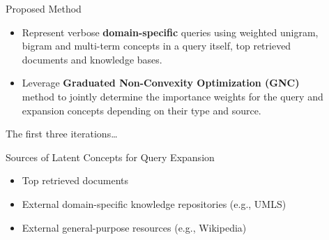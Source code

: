 \documentclass[final]{beamer}
\newlength{\sepwid}
\newlength{\onecolwid}
\newlength{\twocolwid}
\begin{document}
\begin{frame}[t]
\begin{columns}[t]
\begin{column}{\onecolwid}
\end{column} %

\begin{column}{\sepwid}\end{column} %

\begin{column}{\twocolwid} %


\begin{alertblock}{Proposed Method}
  \begin{itemize}
\item Represent verbose \textbf{domain-specific } queries using weighted unigram, bigram and multi-term concepts in a query itself, top retrieved documents and knowledge bases.
\item Leverage \textbf{Graduated Non-Convexity Optimization (GNC)} method to jointly determine the importance weights for the query and expansion concepts depending on their type and source.
\end{itemize}
\end{alertblock}


\begin{alertblock}{The first three iterations\ldots}
  \begin{figure}[!htb]
  \centering
  \end{figure}
\end{alertblock}

\begin{alertblock}{ Sources of Latent Concepts for Query Expansion}
\begin{itemize}
\item Top retrieved documents
\item External domain-specific knowledge repositories (e.g., UMLS)
\item External general-purpose resources (e.g., Wikipedia)
\end{itemize}

\end{alertblock}


\end{column}
\end{columns}
\end{frame}
\end{document}
